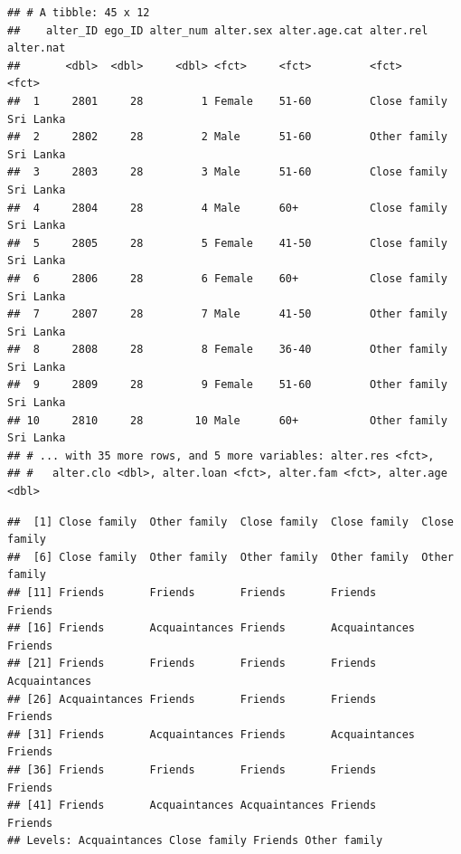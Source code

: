 \documentclass[
]{book}
\newenvironment{Shaded}{\begin{snugshade}}{\end{snugshade}}
\newcommand{\CommentTok}[1]{\textcolor[rgb]{0.56,0.35,0.01}{\textit{#1}}}
\newcommand{\FloatTok}[1]{\textcolor[rgb]{0.00,0.00,0.81}{#1}}
\newcommand{\NormalTok}[1]{#1}
\newcommand{\SpecialCharTok}[1]{\textcolor[rgb]{0.00,0.00,0.00}{#1}}
\begin{document}
\begin{verbatim}
## # A tibble: 45 x 12
##    alter_ID ego_ID alter_num alter.sex alter.age.cat alter.rel    alter.nat
##       <dbl>  <dbl>     <dbl> <fct>     <fct>         <fct>        <fct>    
##  1     2801     28         1 Female    51-60         Close family Sri Lanka
##  2     2802     28         2 Male      51-60         Other family Sri Lanka
##  3     2803     28         3 Male      51-60         Close family Sri Lanka
##  4     2804     28         4 Male      60+           Close family Sri Lanka
##  5     2805     28         5 Female    41-50         Close family Sri Lanka
##  6     2806     28         6 Female    60+           Close family Sri Lanka
##  7     2807     28         7 Male      41-50         Other family Sri Lanka
##  8     2808     28         8 Female    36-40         Other family Sri Lanka
##  9     2809     28         9 Female    51-60         Other family Sri Lanka
## 10     2810     28        10 Male      60+           Other family Sri Lanka
## # ... with 35 more rows, and 5 more variables: alter.res <fct>,
## #   alter.clo <dbl>, alter.loan <fct>, alter.fam <fct>, alter.age <dbl>
\end{verbatim}

\begin{Shaded}
\end{Shaded}

\begin{verbatim}
##  [1] Close family  Other family  Close family  Close family  Close family 
##  [6] Close family  Other family  Other family  Other family  Other family 
## [11] Friends       Friends       Friends       Friends       Friends      
## [16] Friends       Acquaintances Friends       Acquaintances Friends      
## [21] Friends       Friends       Friends       Friends       Acquaintances
## [26] Acquaintances Friends       Friends       Friends       Friends      
## [31] Friends       Acquaintances Friends       Acquaintances Friends      
## [36] Friends       Friends       Friends       Friends       Friends      
## [41] Friends       Acquaintances Acquaintances Friends       Friends      
## Levels: Acquaintances Close family Friends Other family
\end{verbatim}
\end{document}
